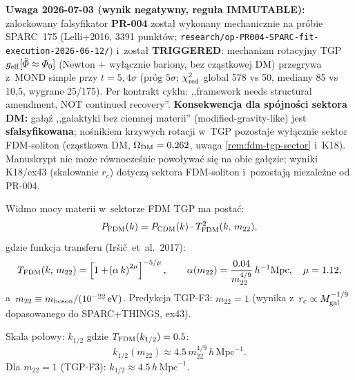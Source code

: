 \begin{remark}\label{rem:PR004-mg-vs-dm}
\textbf{Uwaga 2026-07-03 (wynik negatywny, regu\l{}a IMMUTABLE):}
zalockowany falsyfikator \textbf{PR-004} zosta\l{} wykonany mechanicznie
na pr\'obie SPARC~175 (Lelli+2016, 3391 punkt\'ow;
\texttt{research/op-PR004-SPARC-fit-execution-2026-06-12/}) i~zosta\l{}
\textbf{TRIGGERED}: mechanizm rotacyjny TGP $g_{\rm eff}[\bar\Phi \approx
\Phi_0]$ (Newton $+$ wy\l{}\k{a}cznie bariony, bez cz\k{a}stkowej DM)
przegrywa z~MOND simple przy $t = 5{,}4\sigma$ (pr\'og $5\sigma$;
$\chi^2_{\rm red}$ global 578 vs 50, mediany 85 vs 10{,}5, wygrane
25/175). Per kontrakt cyklu: ,,framework needs structural amendment,
NOT continued recovery''. \textbf{Konsekwencja dla sp\'ojno\'sci
sektora DM:} ga\l{}\k{a}\'z ,,galaktyki bez ciemnej materii''
(modified-gravity-like) jest \textbf{sfalsyfikowana}; no\'snikiem
krzywych rotacji w~TGP pozostaje wy\l{}\k{a}cznie sektor FDM-soliton
(cz\k{a}stkowa DM, $\Omega_{\rm DM} = 0{,}262$, uwaga
\ref{rem:fdm-tgp-sector} i~K18). Manuskrypt nie mo\.ze r\'ownocze\'snie
powo\l{}ywa\'c si\k{e} na obie ga\l{}\k{e}zie; wyniki K18/ex43
(skalowanie $r_c$) dotycz\k{a} sektora FDM-soliton i~pozostaj\k{a}
niezale\.zne od PR-004.
\end{remark}

\begin{proposition}\label{prop:fdm-transfer}
Widmo mocy materii w~sektorze FDM TGP ma posta\'c:
\begin{equation}\label{eq:P-fdm}
  P_{\rm FDM}(k) = P_{\rm CDM}(k)\cdot T_{\rm FDM}^2(k,\,m_{22}),
\end{equation}
gdzie funkcja transferu (Ir\v{s}i\v{c}~et~al.\ 2017):
\begin{equation}\label{eq:T-fdm}
  T_{\rm FDM}(k,\,m_{22}) =
    \left[1 + \!\left(\alpha\,k\right)^{2\mu}\right]^{-5/\mu},
  \qquad
  \alpha(m_{22}) = \frac{0.04}{m_{22}^{4/9}}\,h^{-1}\mathrm{Mpc},
  \quad \mu = 1.12,
\end{equation}
a~$m_{22} \equiv m_{\rm boson}/(10^{-22}\,\mathrm{eV})$.
Predykcja TGP-F3: $m_{22} = 1$ (wynika z~$r_c \propto M_{\rm gal}^{-1/9}$
dopasowanego do SPARC+THINGS, ex43).

Skala po\l{}owy: $k_{1/2}$ gdzie $T_{\rm FDM}(k_{1/2}) = 0.5$:
\begin{equation}\label{eq:k-half}
  k_{1/2}(m_{22}) \approx 4.5\,m_{22}^{4/9}\,h\,\mathrm{Mpc}^{-1}.
\end{equation}
Dla $m_{22}=1$ (TGP-F3): $k_{1/2} \approx 4.5\,h\,\mathrm{Mpc}^{-1}$.
\end{proposition}

